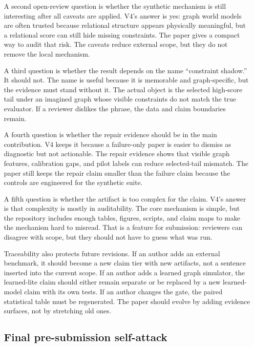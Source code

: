 \documentclass{article}
\begin{document}
A second open-review question is whether the synthetic mechanism is still
interesting after all caveats are applied.  V4's answer is yes: graph world
models are often trusted because relational structure appears physically
meaningful, but a relational score can still hide missing constraints.  The
paper gives a compact way to audit that risk.  The caveats reduce external
scope, but they do not remove the local mechanism.

A third question is whether the result depends on the name ``constraint
shadow.''  It should not.  The name is useful because it is memorable and
graph-specific, but the evidence must stand without it.  The actual object is
the selected high-score tail under an imagined graph whose visible constraints
do not match the true evaluator.  If a reviewer dislikes the phrase, the data
and claim boundaries remain.

A fourth question is whether the repair evidence should be in the main
contribution.  V4 keeps it because a failure-only paper is easier to dismiss as
diagnostic but not actionable.  The repair evidence shows that visible graph
features, calibration gaps, and pilot labels can reduce selected-tail mismatch.
The paper still keeps the repair claim smaller than the failure claim because
the controls are engineered for the synthetic suite.

A fifth question is whether the artifact is too complex for the claim.  V4's
answer is that complexity is mostly in auditability.  The core mechanism is
simple, but the repository includes enough tables, figures, scripts, and claim
maps to make the mechanism hard to misread.  That is a feature for submission:
reviewers can disagree with scope, but they should not have to guess what was
run.

Traceability also protects future revisions.  If an author adds an external
benchmark, it should become a new claim tier with new artifacts, not a sentence
inserted into the current scope.  If an author adds a learned graph simulator,
the learned-lite claim should either remain separate or be replaced by a new
learned-model claim with its own tests.  If an author changes the gate, the
paired statistical table must be regenerated.  The paper should evolve by
adding evidence surfaces, not by stretching old ones.

\subsection{Final pre-submission self-attack}
\end{document}
